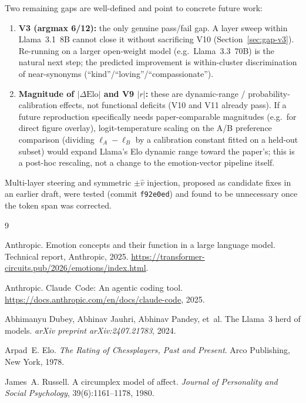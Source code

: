 \documentclass[11pt,a4paper]{article}
\begin{document}
Two remaining gaps are well-defined and point to concrete future
work:
\begin{enumerate}[nosep]
  \item \textbf{V3 (argmax 6/12):} the only genuine pass/fail gap.
    A layer sweep within Llama~3.1~8B cannot close it without
    sacrificing V10 (Section~\ref{sec:gap-v3}).  Re-running on a
    larger open-weight model (e.g.\ Llama~3.3~70B) is the natural
    next step; the predicted improvement is
    within-cluster discrimination of near-synonyms
    (``kind''/``loving''/``compassionate'').
  \item \textbf{Magnitude of $|\Delta\text{Elo}|$ and V9 $|r|$:}
    these are dynamic-range / probability-calibration effects,
    not functional deficits (V10 and V11 already pass).  If a
    future reproduction specifically needs paper-comparable
    magnitudes (e.g.\ for direct figure overlay), logit-temperature
    scaling on the A/B preference comparison (dividing
    $\ell_A-\ell_B$ by a calibration constant fitted on a held-out
    subset) would expand Llama's Elo dynamic range toward the
    paper's; this is a post-hoc rescaling, not a change to the
    emotion-vector pipeline itself.
\end{enumerate}
Multi-layer steering and symmetric $\pm\hat{v}$ injection, proposed
as candidate fixes in an earlier draft, were tested (commit
\texttt{f92e0ed}) and found to be unnecessary once the token span
was corrected.

\begin{thebibliography}{9}

Anthropic.
\newblock Emotion concepts and their function in a large language model.
\newblock Technical report, Anthropic, 2025.
\newblock \url{https://transformer-circuits.pub/2026/emotions/index.html}.

Anthropic.
\newblock Claude~Code: An agentic coding tool.
\newblock \url{https://docs.anthropic.com/en/docs/claude-code}, 2025.

Abhimanyu Dubey, Abhinav Jauhri, Abhinav Pandey, et~al.
\newblock The {L}lama~3 herd of models.
\newblock \emph{arXiv preprint arXiv:2407.21783}, 2024.

Arpad~E. Elo.
\newblock \emph{The Rating of Chessplayers, Past and Present}.
\newblock Arco Publishing, New York, 1978.

James~A. Russell.
\newblock A circumplex model of affect.
\newblock \emph{Journal of Personality and Social Psychology},
  39(6):1161--1178, 1980.

\end{thebibliography}
\end{document}
